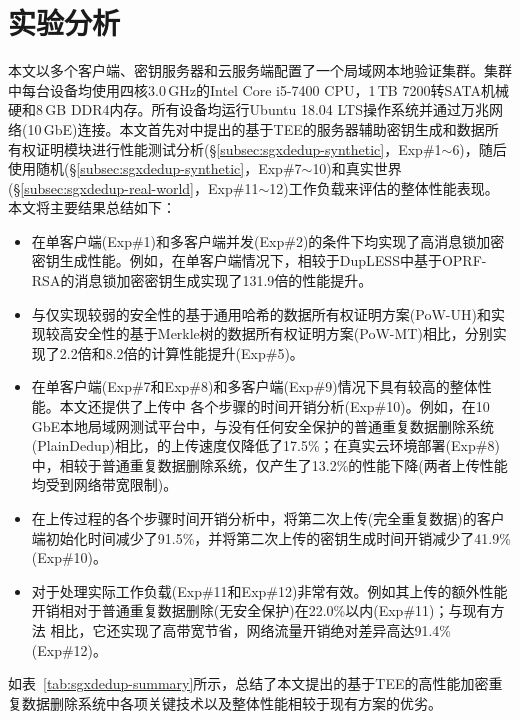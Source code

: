 \section{实验分析}
\label{sec:sgxdedup-evaluation}

本文以多个客户端、密钥服务器和云服务端配置了一个局域网本地验证集群。集群中每台设备均使用四核3.0\,GHz的Intel Core i5-7400 CPU，1\,TB 7200转SATA机械硬和8\,GB DDR4内存。所有设备均运行Ubuntu 18.04 LTS操作系统并通过万兆网络(10\,GbE)连接。本文首先对\sysnameS 中提出的基于TEE的服务器辅助密钥生成和数据所有权证明模块进行性能测试分析(\S\ref{subsec:sgxdedup-synthetic}，Exp\#1$\sim$6)，随后使用随机(\S\ref{subsec:sgxdedup-synthetic}，Exp\#7$\sim$10)和真实世界(\S\ref{subsec:sgxdedup-real-world}，Exp\#11$\sim$12)工作负载来评估\sysnameS 的整体性能表现。本文将主要结果总结如下：

\begin{itemize}
    \item \sysnameS 在单客户端(Exp\#1)和多客户端并发(Exp\#2)的条件下均实现了高消息锁加密密钥生成性能。例如，在单客户端情况下，相较于DupLESS\cite{bellare2013DupLESS}中基于OPRF-RSA的消息锁加密密钥生成实现了131.9倍的性能提升。
    \item \sysnameS 与仅实现较弱的安全性的基于通用哈希的数据所有权证明方案(PoW-UH)\cite{xu2013weak}和实现较高安全性的基于Merkle树的数据所有权证明方案(PoW-MT)\cite{halevi11}相比，分别实现了2.2倍和8.2倍的计算性能提升(Exp\#5)。
    \item \sysnameS 在单客户端(Exp\#7和Exp\#8)和多客户端(Exp\#9)情况下具有较高的整体性能。本文还提供了上传中 \sysnameS 各个步骤的时间开销分析(Exp\#10)。例如，在10\,GbE本地局域网测试平台中，与没有任何安全保护的普通重复数据删除系统(PlainDedup)相比，\sysnameS 的上传速度仅降低了17.5\%；在真实云环境部署(Exp\#8)中，相较于普通重复数据删除系统，\sysnameS 仅产生了13.2\%的性能下降(两者上传性能均受到网络带宽限制)。
    \item 在上传过程的各个步骤时间开销分析中，\sysnameS 将第二次上传(完全重复数据)的客户端初始化时间减少了91.5\%，并将第二次上传的密钥生成时间开销减少了41.9\%(Exp\#10)。
    \item \sysnameS 对于处理实际工作负载(Exp\#11和Exp\#12)非常有效。例如其上传的额外性能开销相对于普通重复数据删除(无安全保护)在22.0\%以内(Exp\#11)；与现有方法\cite{li15,harnik2010side} 相比，它还实现了高带宽节省，网络流量开销绝对差异高达91.4\%(Exp\#12)。
\end{itemize}

如表~\ref{tab:sgxdedup-summary}所示，总结了本文提出的基于TEE的高性能加密重复数据删除系统\sysnameS 中各项关键技术以及整体性能相较于现有方案的优劣。

